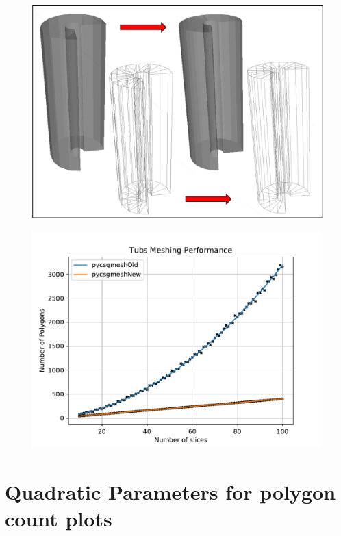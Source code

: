\documentclass[12pt,a4paper]{article}
\begin{document}
\begin{figure}[h!]
\centering
\begin{minipage}{.2\textwidth}
  \centering
  \includegraphics[height=0.7\linewidth]{Images//Meshes//tubs.png}
  \label{fig:test1}
\end{minipage}%
\begin{minipage}{.3\textwidth}
  \centering
  \includegraphics[scale=0.35]{Images//Quad_fits//Tubs_quad.pdf}
  \label{fig:test2}
\end{minipage}%
\end{figure}

\endgroup
\onecolumn
\section{Quadratic Parameters for polygon count plots}
\end{document}
